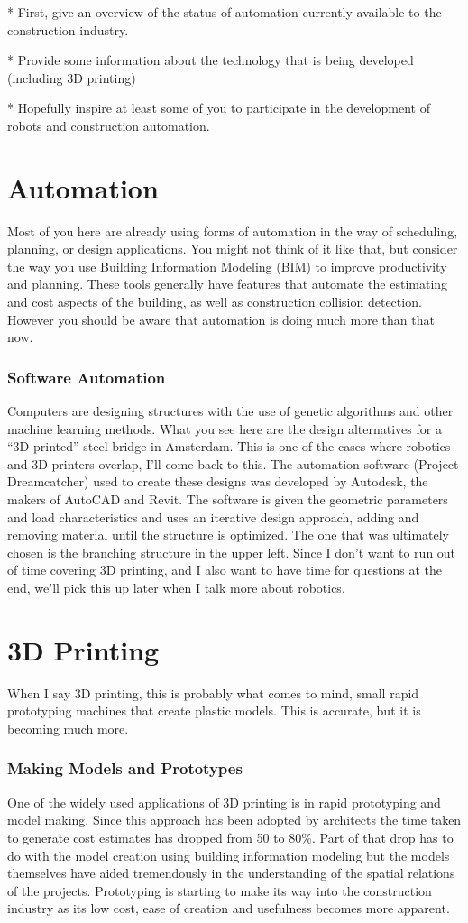 \documentclass[12pt]{article}
\begin{document}
* First, give an overview of the status of automation currently available to the construction industry.

* Provide some information about the technology that is being developed (including 3D printing)

* Hopefully inspire at least some of you to participate in the development of robots and construction automation.
\section{Automation}
Most of you here are already using forms of automation in the way of scheduling, planning, or design applications.  You might not think of it like that, but consider the way you use Building Information Modeling (BIM) to improve productivity and planning.  These tools generally have features that automate the estimating and cost aspects of the building, as well as construction collision detection. However you should be aware that automation is doing much more than that now.
\subsubsection{Software Automation}
Computers are designing structures with the use of genetic algorithms and other machine learning methods.  What you see here are the design alternatives for a ``3D printed'' steel bridge in Amsterdam.  This is one of the cases where robotics and 3D printers overlap, I'll come back to this.  The automation software (Project Dreamcatcher) used to create these designs was developed by Autodesk, the makers of AutoCAD and Revit.  The software is given the geometric parameters and load characteristics and uses an iterative design approach, adding and removing material until the structure is optimized.  The one that was ultimately chosen is the branching structure in the upper left.  Since I don't want to run out of time covering 3D printing, and I also want to have time for questions at the end, we'll pick this up later when I talk more about robotics.
\section{3D Printing}
When I say 3D printing, this is probably what comes to mind, small rapid prototyping machines that create plastic models. This is accurate, but it is becoming much more.
\subsubsection{Making Models and Prototypes}
One of the widely used applications of 3D printing is in rapid prototyping and model making.  Since this approach has been adopted by architects the time taken to generate cost estimates has dropped from 50 to 80\%.  Part of that drop has to do with the model creation using building information modeling but the models themselves have aided tremendously in the understanding of the spatial relations of the projects.  Prototyping is starting to make its way into the construction industry as its low cost, ease of creation and usefulness becomes more apparent.
\end{document}
